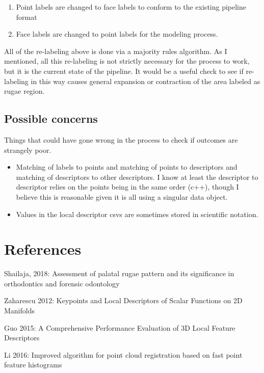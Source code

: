 \documentclass[11pt]{article}
\theoremstyle{definition}
\begin{document}
\begin{itemize}
\begin{enumerate}
\begin{itemize}
        \end{itemize}
        \item Point labels are changed to face labels to conform to the existing pipeline format
        \item Face labels are changed to point labels for the modeling process.
    \end{enumerate}
    All of the re-labeling above is done via a majority rules algorithm. As I mentioned, all this re-labeling is not strictly necessary for the process to work, but it is the current state of the pipeline. It would be a useful check to see if re-labeling in this way causes general expansion or contraction of the area labeled as rugae region. 
\end{itemize}

\subsection{Possible concerns}

Things that could have gone wrong in the process to check if outcomes are strangely poor.

\begin{itemize}
    \item Matching of labels to points and matching of points to descriptors and matching of descriptors to other descriptors. I know at least the descriptor to descriptor relies on the points being in the same order (c++), though I believe this is reasonable given it is all using a singular data object.
    \item Values in the local descriptor csvs are sometimes stored in scientific notation.
\end{itemize}


\newpage

\section{References}

Shailaja, 2018: Assessment of palatal rugae pattern and its significance in orthodontics and forensic odontology

Zaharescu 2012: Keypoints and Local Descriptors of Scalar Functions on 2D Manifolds

Guo 2015: A Comprehensive Performance Evaluation of 3D Local Feature Descriptors

Li 2016: Improved algorithm for point cloud registration based on fast point feature histograms
\end{document}
